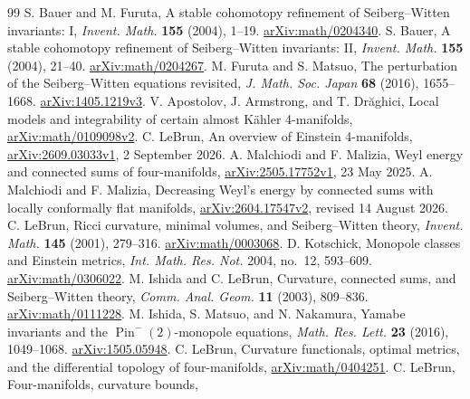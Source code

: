 \begin{thebibliography}{99}
 S. Bauer and M. Furuta,
A stable cohomotopy refinement of Seiberg--Witten invariants: I,
\emph{Invent. Math.} \textbf{155} (2004), 1--19.
\href{https://arxiv.org/abs/math/0204340}{arXiv:math/0204340}.
 S. Bauer,
A stable cohomotopy refinement of Seiberg--Witten invariants: II,
\emph{Invent. Math.} \textbf{155} (2004), 21--40.
\href{https://arxiv.org/abs/math/0204267}{arXiv:math/0204267}.
 M. Furuta and S. Matsuo,
The perturbation of the Seiberg--Witten equations revisited,
\emph{J. Math. Soc. Japan} \textbf{68} (2016), 1655--1668.
\href{https://arxiv.org/abs/1405.1219v3}{arXiv:1405.1219v3}.
 V. Apostolov, J. Armstrong,
and T. Dr\u aghici,
Local models and integrability of certain almost K\"ahler 4-manifolds,
\href{https://arxiv.org/abs/math/0109098v2}{arXiv:math/0109098v2}.
 C. LeBrun,
An overview of Einstein 4-manifolds,
\href{https://arxiv.org/abs/2609.03033v1}{arXiv:2609.03033v1},
2 September 2026.
 A. Malchiodi and F. Malizia,
Weyl energy and connected sums of four-manifolds,
\href{https://arxiv.org/abs/2505.17752v1}{arXiv:2505.17752v1},
23 May 2025.
 A. Malchiodi and F. Malizia,
Decreasing Weyl's energy by connected sums with locally conformally flat
manifolds,
\href{https://arxiv.org/abs/2604.17547v2}{arXiv:2604.17547v2},
revised 14 August 2026.
 C. LeBrun, Ricci curvature, minimal volumes, and
Seiberg--Witten theory, \emph{Invent. Math.} \textbf{145} (2001), 279--316.
\href{https://arxiv.org/abs/math/0003068}{arXiv:math/0003068}.
 D. Kotschick, Monopole classes and Einstein
metrics, \emph{Int. Math. Res. Not.} 2004, no.~12, 593--609.
\href{https://arxiv.org/abs/math/0306022}{arXiv:math/0306022}.
 M. Ishida and C. LeBrun, Curvature,
connected sums, and Seiberg--Witten theory,
\emph{Comm. Anal. Geom.} \textbf{11} (2003), 809--836.
\href{https://arxiv.org/abs/math/0111228}{arXiv:math/0111228}.
 M. Ishida, S. Matsuo, and N. Nakamura, Yamabe
invariants and the $\operatorname{Pin}^{-}(2)$-monopole equations,
\emph{Math. Res. Lett.} \textbf{23} (2016), 1049--1068.
\href{https://arxiv.org/abs/1505.05948}{arXiv:1505.05948}.
 C. LeBrun, Curvature functionals, optimal metrics,
and the differential topology of four-manifolds,
\href{https://arxiv.org/abs/math/0404251}{arXiv:math/0404251}.
 C. LeBrun, Four-manifolds, curvature bounds,

\end{thebibliography}
